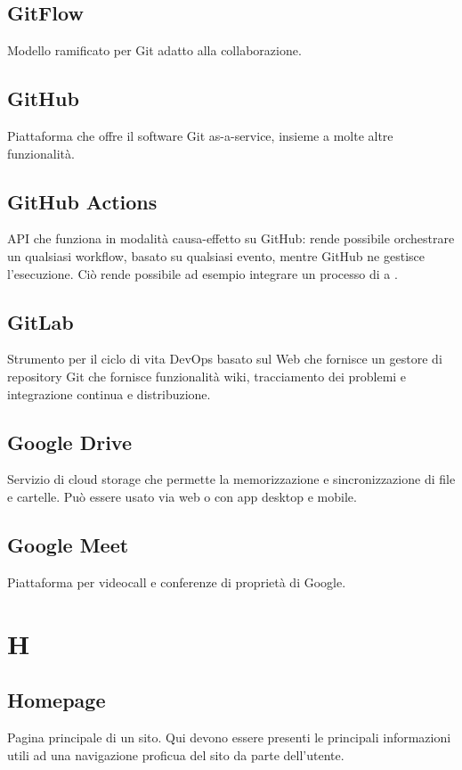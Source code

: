 \subsection*{GitFlow}
Modello ramificato per Git adatto alla collaborazione.

\subsection*{GitHub}
Piattaforma che offre il software Git as-a-service, insieme a molte altre funzionalità.

\subsection*{GitHub Actions}
API che funziona in modalità causa-effetto su GitHub: rende possibile orchestrare un qualsiasi workflow, basato su qualsiasi evento, mentre GitHub ne gestisce l’esecuzione. Ciò rende possibile ad esempio integrare un processo di  a .

\subsection*{GitLab}
Strumento per il ciclo di vita DevOps basato sul Web che fornisce un gestore di repository Git che fornisce funzionalità wiki, tracciamento dei problemi e integrazione continua e distribuzione.

\subsection*{Google Drive}
Servizio di cloud storage che permette la memorizzazione e sincronizzazione di file e cartelle. Può essere usato via web o con app desktop e mobile.

\subsection*{Google Meet}
Piattaforma per videocall e conferenze di proprietà di Google.

\newpage
\section{H}
\subsection*{Homepage}
Pagina principale di un sito. Qui devono essere presenti le principali informazioni utili ad una navigazione proficua del sito da parte dell'utente.


